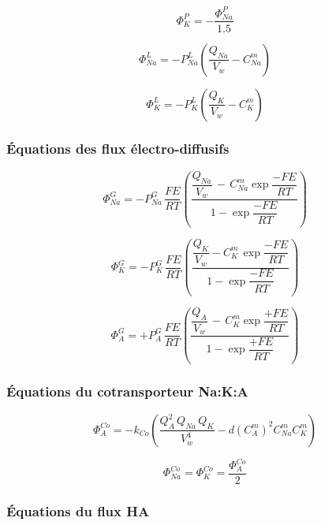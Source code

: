 \documentclass[a4paper,fleqn]{article}
\begin{document}
\begin{equation}
\Phi_{K}^{P}=-\frac{\Phi_{Na}^{P}}{1.5}
\end{equation}

\begin{equation}
\Phi_{Na}^{L}=-P_{Na}^{L}\left(\frac{Q_{Na}}{V_w}-C_{Na}^{m}\right)
\end{equation}

\begin{equation}
\Phi_{K}^{L}=-P_{K}^{L}\left(\frac{Q_{K}}{V_w}-C_{K}^{m}\right)
\end{equation}

\subsubsection*{Équations des flux électro-diffusifs}

\begin{equation}
\Phi_{Na}^{G}=-P_{Na}^{G}\,\frac{FE}{RT}\left(\frac{\dfrac{Q_{Na}}{V_w}\,-\,{C_{Na}^{m}\exp{\dfrac{-FE}{RT}}}}{1 - \exp{\dfrac{-FE}{RT}}}\right)
\end{equation}

\begin{equation}
\Phi_{K}^{G}=-P_{K}^{G}\,\frac{FE}{RT}\left(\dfrac{\dfrac{Q_{K}}{V_w}-{C_{K}^{m}\,\exp{\dfrac{-FE}{RT}}}}{1 - \exp{\dfrac{-FE}{RT}}}\right)
\end{equation}

\begin{equation}
\Phi_{A}^{G}=+P_{A}^{G}\,\frac{FE}{RT}\left(\dfrac{\dfrac{Q_{A}}{V_w}\,-\,{C_{K}^{m}\exp{\dfrac{+FE}{RT}}}}{1 - \exp{\dfrac{+FE}{RT}}}\right)
\end{equation}

\subsubsection*{Équations du cotransporteur Na:K:A}

\begin{equation}
\Phi_{A}^{Co}=-k_{Co}\left(\frac{Q_{A}^2\,Q_{Na}\,Q_{K}}{V_w^4}-d\left(C_{A}^{m}\right)^2C_{Na}^{m}C_{K}^{m}\right)
\end{equation}

\begin{equation}
\Phi_{Na}^{Co}=\Phi_{K}^{Co}=\frac{\Phi_{A}^{Co}}{2}
\end{equation}

\subsubsection*{Équations du flux HA}
\end{document}
